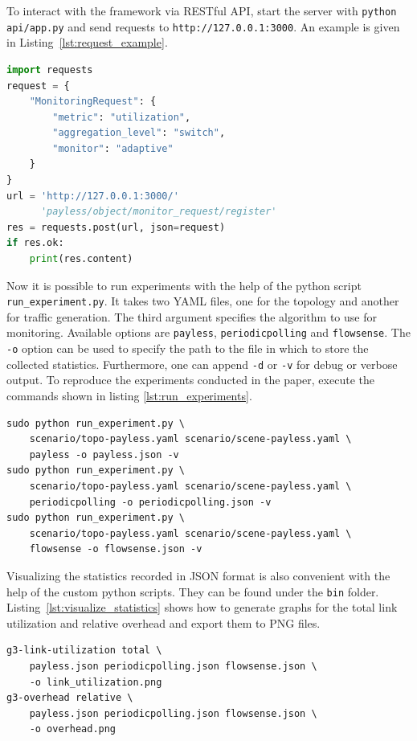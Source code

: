 \documentclass[DIV=12]{scrartcl}
\begin{document}
To interact with the framework via RESTful API, start the server with \texttt{python api/app.py} and send requests to \texttt{http://127.0.0.1:3000}.
An example is given in Listing~\ref{lst:request_example}.

\begin{lstlisting}[language=Python, float=htbp, caption={Start Server}, label={lst:request_example}]
import requests
request = {
    "MonitoringRequest": {
        "metric": "utilization",
        "aggregation_level": "switch",
        "monitor": "adaptive"
    }
}
url = 'http://127.0.0.1:3000/'
      'payless/object/monitor_request/register'
res = requests.post(url, json=request)
if res.ok:
    print(res.content)
\end{lstlisting}

Now it is possible to run experiments with the help of the python script \texttt{run\_experiment.py}.
It takes two YAML files, one for the topology and another for traffic generation.
The third argument specifies the algorithm to use for monitoring.
Available options are \texttt{payless}, \texttt{periodicpolling} and \texttt{flowsense}.
The \texttt{-o} option can be used to specify the path to the file in which to store the collected statistics.
Furthermore, one can append \texttt{-d} or \texttt{-v} for debug or verbose output.
To reproduce the experiments conducted in the paper, execute the commands shown in listing \ref{lst:run_experiments}.

\begin{lstlisting}[float=htbp, caption={Run experiments}, label={lst:run_experiments}]
sudo python run_experiment.py \
    scenario/topo-payless.yaml scenario/scene-payless.yaml \
    payless -o payless.json -v
sudo python run_experiment.py \
    scenario/topo-payless.yaml scenario/scene-payless.yaml \
    periodicpolling -o periodicpolling.json -v
sudo python run_experiment.py \
    scenario/topo-payless.yaml scenario/scene-payless.yaml \
    flowsense -o flowsense.json -v
\end{lstlisting}

Visualizing the statistics recorded in JSON format is also convenient with the help of the custom python scripts.
They can be found under the \texttt{bin} folder.
Listing~\ref{lst:visualize_statistics} shows how to generate graphs for the total link utilization and relative overhead and export them to PNG files.

\begin{lstlisting}[float=htbp, caption={Visualize statistics}, label={lst:visualize_statistics}]
g3-link-utilization total \
    payless.json periodicpolling.json flowsense.json \
    -o link_utilization.png
g3-overhead relative \
    payless.json periodicpolling.json flowsense.json \
    -o overhead.png
\end{lstlisting}
\end{document}
